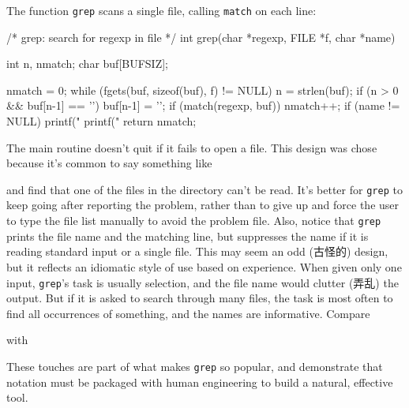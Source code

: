 The function \verb'grep' scans a single file, calling
\verb'match' on each line:
\begin{wellcode}
    /* grep: search for regexp in file */
    int grep(char *regexp, FILE *f, char *name)
    {
        int     n, nmatch;
        char    buf[BUFSIZ];

        nmatch = 0;
        while (fgets(buf, sizeof(buf), f) != NULL) {
            n = strlen(buf);
            if (n > 0 && buf[n-1] == '\n')
                buf[n-1] = '\0';
            if (match(regexp, buf)) {
                nmatch++;
                if (name != NULL)
                    printf("%
                printf("%
            }
        }
        return nmatch;
    }
\end{wellcode}

The main routine doesn't quit if it fails to open a file. This design was
chose because it's common to say something like
\begin{wellcode}
\end{wellcode}
and find that one of the files in the directory can't be read. It's better
for \verb'grep' to keep going after reporting the problem, rather than to
give up and force the user to type the file list manually to avoid the
problem file. Also, notice that \verb'grep' prints the file name and the
matching line, but suppresses the name if it is reading standard input or a
single file. This may seem an odd (古怪的) design, but it reflects an
idiomatic style of use based on experience. When given only one input,
\verb'grep''s task is usually selection, and the file name would clutter
(弄乱) the output. But if it is asked to search through many files, the
task is most often to find all occurrences of something, and the names are
informative. Compare
\begin{wellcode}
\end{wellcode}
with
\begin{wellcode}
\end{wellcode}
These touches are part of what makes \verb'grep' so popular, and
demonstrate that notation must be packaged with human engineering to build
a natural, effective tool.

